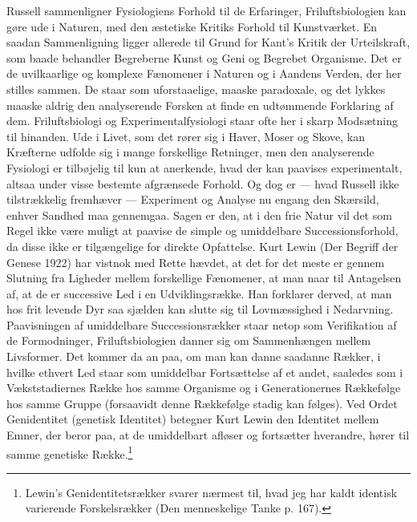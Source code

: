 \documentclass[12pt]{article}
\newcommand{\opage}[1]{\marginnote{\footnotesize\textit{[#1]}}}
\begin{document}
Russell sammenligner Fysiologiens Forhold til de Erfaringer,
Friluftsbiologien kan gøre ude i Naturen, med den æstetiske Kritiks
Forhold til Kunstværket. En saadan Sammenligning ligger allerede til
Grund for Kant's \guillemotright{}Kritik der Urteilskraft\guillemotleft{}, som baade behandler
Begreberne Kunst og Geni og Begrebet Organisme. Det er de
uvilkaarlige og komplexe Fænomener i Naturen og i Aandens Verden, der
her stilles sammen. De staar som uforstaaelige, maaske paradoxale, og
det lykkes maaske aldrig den analyserende Forsken at finde en
udtømmende Forklaring af dem. Friluftsbiologi og Experimentalfysiologi
staar ofte her i skarp Modsætning til hinanden. Ude i Livet, som det
rører sig i Haver, Moser og Skove, kan Kræfterne udfolde sig i mange
forskellige Retninger, men den analyserende Fysiologi er tilbøjelig
til kun at anerkende, hvad der kan paavises experimentalt, altsaa
under visse bestemte afgrænsede Forhold. Og dog er --- hvad Russell
ikke tilstrækkelig fremhæver --- Experiment og Analyse nu engang den
Skærsild, enhver Sandhed maa gennemgaa. Sagen er den, at i den frie
Natur vil det som Regel ikke være muligt at paavise de simple og
umiddelbare Successionsforhold, da disse ikke er tilgængelige for
direkte Opfattelse. Kurt Lewin (Der Begriff der Genese 1922) har
vistnok med Rette hævdet, at det for det meste er gennem Slutning fra
Ligheder mellem forskellige Fænomener, at man naar til Antagelsen af,
at de er successive Led i en Udviklingsrække. Han forklarer derved, at
man hos frit levende Dyr saa sjælden kan slutte sig til Lovmæssighed i
Nedarvning. Paavisningen af umiddelbare Successionsrækker staar netop
som Verifikation af de Formodninger, Friluftsbiologien danner sig om
\setcounter{footnote}{0}%
\opage{26}Sammenhængen mellem Livsformer. Det kommer da an paa, om man kan
danne saadanne Rækker, i hvilke ethvert Led staar som umiddelbar
Fortsættelse af et andet, saaledes som i Vækststadiernes Række hos
samme Organisme og i Generationernes Rækkefølge hos samme Gruppe
(forsaavidt denne Rækkefølge stadig kan følges). Ved Ordet
\guillemotright{}Genidentitet\guillemotleft{} (genetisk Identitet) betegner Kurt Lewin den Identitet
mellem Emner, der beror paa, at de umiddelbart afløser og fortsætter
hverandre, hører til samme genetiske Række.\footnote{Lewin's
Genidentitetsrækker svarer nærmest til, hvad jeg har kaldt identisk
varierende Forskelsrækker (Den menneskelige Tanke p. 167).}
\end{document}
